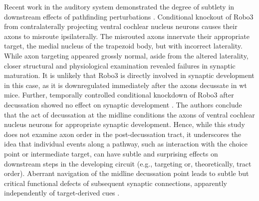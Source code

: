 Recent work in the auditory system demonstrated the degree of subtlety in downstream effects of pathfinding perturbations \cite{michalski2013robo3}.
Conditional knockout of Robo3 from contralaterally projecting ventral cochlear nucleus neurons causes their axons to misroute ipsilaterally. 
The misrouted axons innervate their appropriate target, the medial nucleus of the trapezoid body, but with incorrect laterality. 
While axon targeting appeared grossly normal, aside from the altered laterality, closer structural and physiological examination revealed failures in synaptic maturation.
It is unlikely that Robo3 is directly involved in synaptic development in this case, as it is downregulated immediately after the axons decussate in wt mice. 
Further, temporally controlled conditional knockdown of Robo3 after decussation showed no effect on synaptic development \cite{michalski2013robo3}.
The authors conclude that the act of decussation at the midline conditions the axons of ventral cochlear nucleus neurons for appropriate synaptic development.
Hence, while this study does not examine axon order in the post-decussation tract, it underscores the idea that individual events along a pathway, such as interaction with the choice point or intermediate target, can have subtle and surprising effects on downstream steps in the developing circuit (e.g., targeting or, theoretically, tract order).
Aberrant navigation of the midline decussation point leads to subtle but critical functional defects of subsequent synaptic connections, apparently independently of target-derived cues \cite{michalski2013robo3}.